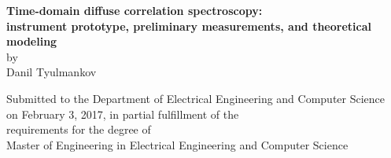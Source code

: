 \cleardoublepage
\begin{center}
{\large{\bf Time-domain diffuse correlation spectroscopy:\\ instrument prototype, preliminary measurements, and theoretical modeling} \\
by \\
Danil Tyulmankov\\[\baselineskip]}
\par

Submitted to the Department of Electrical Engineering and Computer Science \\
on February 3, 2017, in partial fulfillment of the \\
requirements for the degree of \\
Master of Engineering in Electrical Engineering and Computer Science
\end{center}
\par
